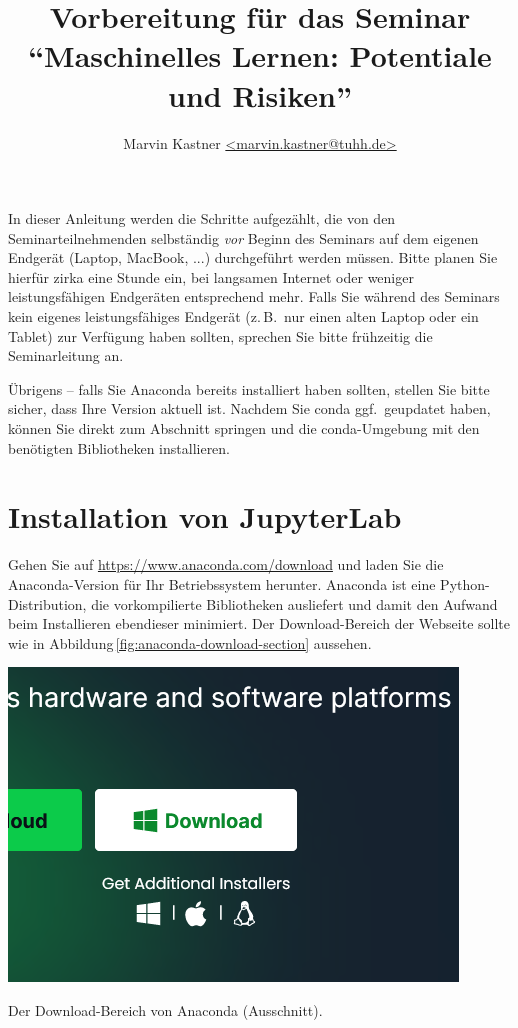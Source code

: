 \documentclass[nobib]{tufte-handout}
\title{Vorbereitung für das Seminar\\
\enquote{Maschinelles Lernen: Potentiale und Risiken}}
\author{Marvin Kastner \href{mailto:marvin.kastner@tuhh.de}{<marvin.kastner@tuhh.de>}}
\begin{document}
\maketitle%

In dieser Anleitung werden die Schritte aufgezählt, die von den Seminarteilnehmenden selbständig \emph{vor} Beginn des Seminars auf dem eigenen Endgerät (Laptop, MacBook, ...) durchgeführt werden müssen.
Bitte planen Sie hierfür zirka eine Stunde ein, bei langsamen Internet oder weniger leistungsfähigen Endgeräten entsprechend mehr.
Falls Sie während des Seminars kein eigenes leistungsfähiges Endgerät (z.\,B.\ nur einen alten Laptop oder ein Tablet) zur Verfügung haben sollten, sprechen Sie bitte frühzeitig die Seminarleitung an.

Übrigens -- falls Sie Anaconda bereits installiert haben sollten, stellen Sie bitte sicher, dass Ihre Version aktuell ist.
Nachdem Sie conda ggf.\ geupdatet haben, können Sie direkt zum Abschnitt \emph{} springen und die conda-Umgebung mit den benötigten Bibliotheken installieren.


\section{Installation von JupyterLab}

Gehen Sie auf
\url{https://www.anaconda.com/download} 
und laden Sie die Anaconda-Version für Ihr Betriebssystem herunter.
Anaconda ist eine Python-Distribution, die vorkompilierte Bibliotheken ausliefert und damit den Aufwand beim Installieren ebendieser minimiert.
Der Download-Bereich der Webseite sollte wie in Abbildung\,\ref{fig:anaconda-download-section} aussehen.

\begin{marginfigure}
  \includegraphics{anaconda_download_section}
  \caption{Der Download-Bereich von Anaconda (Ausschnitt).}%
\label{fig:anaconda-download-section}
\end{marginfigure}
\end{document}
